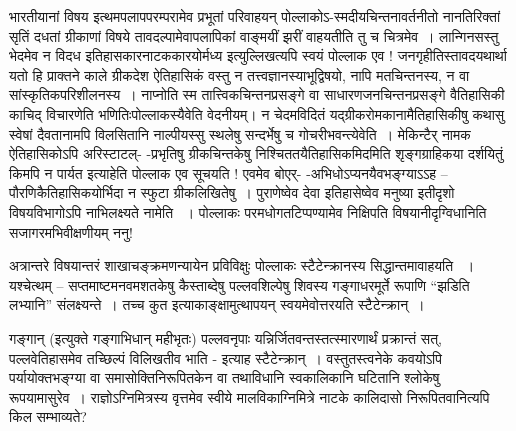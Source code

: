 भारतीयानां विषय इत्थमपलापपरम्परामेव प्रभूतां परिवाहयन् पोल्लाकोऽ-स्मदीयचिन्तनावर्तनीतो नानतिरिक्तां सृतिं दधतां ग्रीकाणां विषये तावदल्पामेवापलापिकां वाङ्मयीं झरीं वाहयतीति तु च चित्रमेव~। लान्गिनसस्तु  भेदमेव न विदध इतिहासकारनाटककारयोर्मध्य इत्युल्लिखत्यपि स्वयं पोल्लाक एव ! जनगृहीतिस्तावदयथार्था यतो हि प्राक्तने काले ग्रीकदेश ऐतिहासिकं वस्तु न तत्त्वज्ञानस्याभूद्विषयो, नापि मतचिन्तनस्य, न वा सांस्कृतिकपरिशीलनस्य~। नाप्नोति स्म तात्त्विकचिन्तनप्रसङ्गे वा साधारणजनचिन्तनप्रसङ्गे वैतिहासिकी काचिद् विचारणेति भणितिःपोल्लाकस्यैवेति वेदनीयम्। न चेदमविदितं यद्ग्रीकरोमकानामैतिहासिकीषु कथासु स्वेषां दैवतानामपि विलसितानि नाल्पीयस्सु स्थलेषु सन्दर्भेषु च गोचरीभवन्त्येवेति~। मेकिन्टैर् नामक ऐतिहासिकोऽपि अरिस्टाटल्- -प्रभृतिषु ग्रीकचिन्तकेषु निश्चिततयैतिहासिकमिदमिति शृङ्गग्राहिकया दर्शयितुं किमपि न पार्यत इत्याहेति पोल्लाक एव सूचयति ! एवमेव बोएर्- -अभिधोऽप्यनयैव\break भङ्ग्याऽऽह – पौरणिकैतिहासिकयोर्भिदा न स्फुटा ग्रीकलिखितेषु~। पुराणेष्वेव देवा इतिहासेष्वेव मनुष्या इतीदृशो विषयविभागोऽपि नाभिलक्ष्यते नामेति ~। पोल्लाकः परमधोगतटिप्पण्यामेव निक्षिपति विषयानीदृग्विधानिति सजागरमभिवीक्षणीयम् ननु!

अत्रान्तरे विषयान्तरं शाखाचङ्क्रमणन्यायेन प्रविविक्षुः पोल्लाकः स्टैटेन्क्रानस्य  सिद्धान्तमावाहयति ~। यश्चेत्थम् – सप्तमाष्टमनवमशतकेषु कैस्ताब्देषु पल्लवशिल्पेषु शिवस्य गङ्गाधरमूर्ते रूपाणि “झडिति लभ्यानि” संलक्ष्यन्ते~। तच्च कुत इत्याकाङ्क्षामुत्थापयन् स्वयमेवोत्तरयति स्टैटेन्क्रान्~।

गङ्गान् (इत्युक्ते गङ्गाभिधान् महीभृतः) पल्लवनृपाः यन्निर्जितवन्तस्तत्स्मारणार्थं प्रक्रान्तं सत्, पल्लवेतिहासमेव तच्छिल्पं विलिखतीव भाति - इत्याह स्टैटेन्क्रान्~। वस्तुतस्त्वनेके कवयोऽपि पर्यायोक्तभङ्ग्या वा समासोक्तिनिरूपितकेन वा तथाविधानि स्वकालिकानि घटितानि श्लोकेषु रूपयामासुरेव~। राज्ञोऽग्निमित्रस्य वृत्तमेव स्वीये मालविकाग्निमित्रे नाटके कालिदासो निरूपितवानित्यपि किल सम्भाव्यते?

